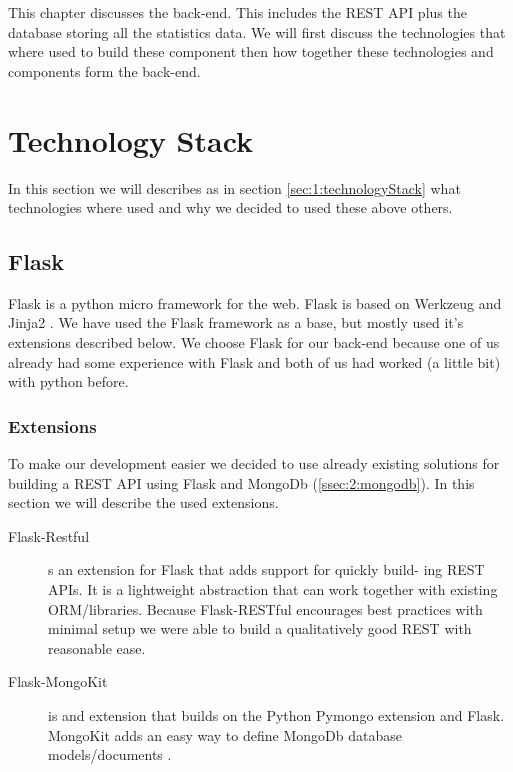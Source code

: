 
This chapter discusses the back-end. This includes the REST API plus the database storing all the statistics data. We will first discuss the technologies that where used to build these component then how together these technologies and components form the back-end.

\section{Technology Stack}
\label{sec:2:technologyStack}
In this section we will describes as in section \ref{sec:1:technologyStack} what technologies where used and why we decided to used these above others.

\subsection{Flask}
\label{ssec:2:flask}
Flask \cite{flask} is a python micro framework for the web. Flask is based on Werkzeug \cite{werkzeug} and Jinja2 \cite{jinja2}. We have used the Flask framework as a base, but mostly used it's extensions described below. We choose Flask for our back-end because one of us already had some experience with Flask and both of us had worked (a little bit) with python before.

\subsubsection{Extensions}
To make our development easier we decided to use already existing solutions for building a REST API using Flask and MongoDb (\autoref{ssec:2:mongodb}). In this section we will describe the used extensions.

\begin{description}

\item[Flask-Restful] s an extension for Flask that adds support for quickly build- ing REST APIs. It is a lightweight abstraction that can work together with existing ORM/libraries. Because Flask-RESTful \cite{flask-restful} encourages best practices with minimal setup we were able to build a qualitatively good REST with reasonable ease.

\item[Flask-MongoKit] is and extension that builds on the Python Pymongo extension \cite{pymongo} and Flask. MongoKit adds an easy way to define MongoDb database models/documents \cite{flask-mongokit}.
\end{description}

